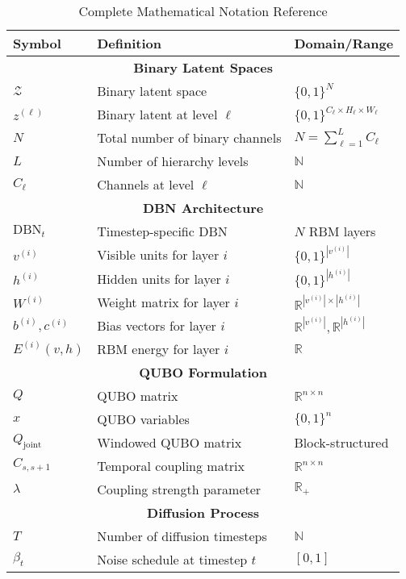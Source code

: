\documentclass{article}
\begin{document}
\begin{table}[H]
\centering
\caption{Complete Mathematical Notation Reference}
\label{tab:notation}
\begin{tabular}{|l|l|l|}
\hline
\textbf{Symbol} & \textbf{Definition} & \textbf{Domain/Range} \\
\hline
\multicolumn{3}{|c|}{\textbf{Binary Latent Spaces}} \\
\hline
$\mathcal{Z}$ & Binary latent space & $\{0,1\}^{N}$ \\
$z^{(\ell)}$ & Binary latent at level $\ell$ & $\{0,1\}^{C_\ell \times H_\ell \times W_\ell}$ \\
$N$ & Total number of binary channels & $N = \sum_{\ell=1}^L C_\ell$ \\
$L$ & Number of hierarchy levels & $\mathbb{N}$ \\
$C_\ell$ & Channels at level $\ell$ & $\mathbb{N}$ \\
\hline
\multicolumn{3}{|c|}{\textbf{DBN Architecture}} \\
\hline
$\text{DBN}_t$ & Timestep-specific DBN & $N$ RBM layers \\
$v^{(i)}$ & Visible units for layer $i$ & $\{0,1\}^{|v^{(i)}|}$ \\
$h^{(i)}$ & Hidden units for layer $i$ & $\{0,1\}^{|h^{(i)}|}$ \\
$W^{(i)}$ & Weight matrix for layer $i$ & $\mathbb{R}^{|v^{(i)}| \times |h^{(i)}|}$ \\
$b^{(i)}, c^{(i)}$ & Bias vectors for layer $i$ & $\mathbb{R}^{|v^{(i)}|}, \mathbb{R}^{|h^{(i)}|}$ \\
$E^{(i)}(v,h)$ & RBM energy for layer $i$ & $\mathbb{R}$ \\
\hline
\multicolumn{3}{|c|}{\textbf{QUBO Formulation}} \\
\hline
$Q$ & QUBO matrix & $\mathbb{R}^{n \times n}$ \\
$x$ & QUBO variables & $\{0,1\}^n$ \\
$Q_{\text{joint}}$ & Windowed QUBO matrix & Block-structured \\
$C_{s,s+1}$ & Temporal coupling matrix & $\mathbb{R}^{n \times n}$ \\
$\lambda$ & Coupling strength parameter & $\mathbb{R}_+$ \\
\hline
\multicolumn{3}{|c|}{\textbf{Diffusion Process}} \\
\hline
$T$ & Number of diffusion timesteps & $\mathbb{N}$ \\
$\beta_t$ & Noise schedule at timestep $t$ & $[0,1]$ \\

\end{tabular}
\end{table}
\end{document}
